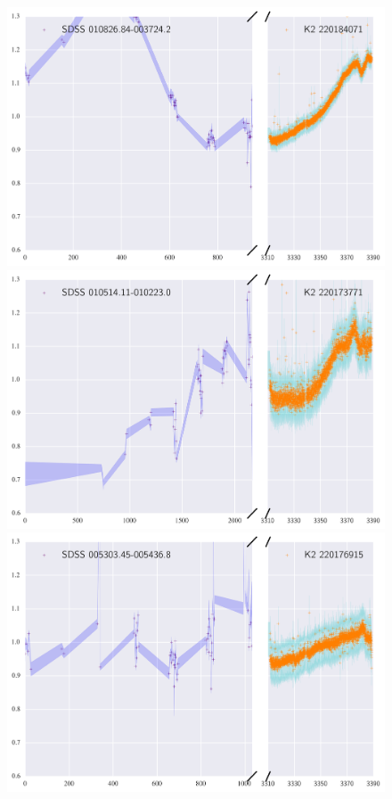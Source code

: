\documentclass[a4paper,fleqn,usenatbib]{mnras}
\begin{document}
          
       \begin{figure}
 	\includegraphics[width=\columnwidth]{220184071ExtendedLC.png}
 	\includegraphics[width=\columnwidth]{220173771ExtendedLC.png}
 	\includegraphics[width=\columnwidth]{220176915ExtendedLC.png}
       	\caption{}
       	\label{fig:example_figure}
       \end{figure}                
          
\end{document}
